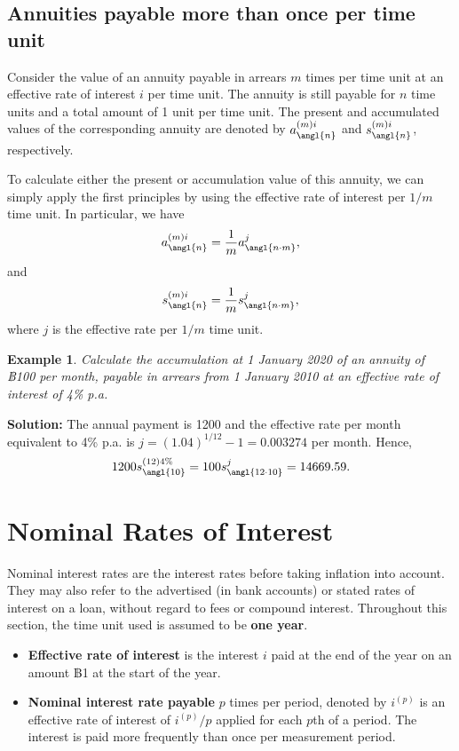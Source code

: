 \documentclass[
]{book}
\theoremstyle{definition}
\theoremstyle{definition}
\newtheorem{example}{Example}[chapter]
\theoremstyle{definition}
\theoremstyle{definition}
\theoremstyle{remark}
\begin{document}
\subsection{Annuities payable more than once per time unit}\label{annuities-payable-more-than-once-per-time-unit}

Consider the value of an annuity payable in arrears \(m\) times per time
unit at an effective rate of interest \(i\) per time unit. The annuity is
still payable for \(n\) time units and a total amount of 1 unit per time
unit. The present and accumulated values of the corresponding annuity
are denoted by \(a^{(m)i}_\angl{n}\) and \(s^{(m)i}_\angl{n}\),
respectively.

To calculate either the present or accumulation value of this annuity,
we can simply apply the first principles by using the effective rate of
interest per \(1/m\) time unit. In particular, we have
\[a^{(m)i}_\angl{n}   = \frac{1}{m}  a^j_\angl{n\cdot m},\] and
\[s^{(m)i}_\angl{n}   = \frac{1}{m}  s^j_\angl{n\cdot m},\] where \(j\) is
the effective rate per \(1/m\) time unit.

\begin{example}
\emph{Calculate the accumulation at 1 January 2020 of an annuity of ฿100 per
month, payable in arrears from 1 January 2010 at an effective rate of
interest of 4\% p.a.}
\end{example}

\textbf{Solution:} The annual payment is 1200 and the effective rate per
month equivalent to 4\% p.a. is \(j = (1.04)^{1/12} - 1 = 0.003274\) per
month. Hence,
\[1200 s^{(12)4\%}_\angl{10}   = 100  s^j_\angl{12\cdot 10} = 14669.59.\]

\section{Nominal Rates of Interest}\label{nominal-rates-of-interest}

Nominal interest rates are the interest rates before taking inflation
into account. They may also refer to the advertised (in bank accounts)
or stated rates of interest on a loan, without regard to fees or
compound interest. Throughout this section, the time unit used is
assumed to be \textbf{one year}.

\begin{itemize}
\item
  \textbf{Effective rate of interest} is the interest \(i\) paid at the end
  of the year on an amount ฿1 at the start of the year.
\item
  \textbf{Nominal interest rate payable} \(p\) times per period, denoted by
  \(i^{(p)}\) is an effective rate of interest of \(i^{(p)}/p\) applied
  for each \(p\)th of a period. The interest is paid more frequently
  than once per measurement period.
\end{itemize}
\end{document}
